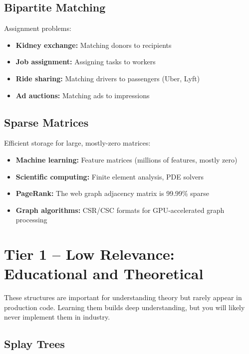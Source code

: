 \subsection{Bipartite Matching}

Assignment problems:
\begin{itemize}
    \item \textbf{Kidney exchange:} Matching donors to recipients
    \item \textbf{Job assignment:} Assigning tasks to workers
    \item \textbf{Ride sharing:} Matching drivers to passengers (Uber, Lyft)
    \item \textbf{Ad auctions:} Matching ads to impressions
\end{itemize}

\subsection{Sparse Matrices}

Efficient storage for large, mostly-zero matrices:
\begin{itemize}
    \item \textbf{Machine learning:} Feature matrices (millions of features, mostly zero)
    \item \textbf{Scientific computing:} Finite element analysis, PDE solvers
    \item \textbf{PageRank:} The web graph adjacency matrix is 99.99\% sparse
    \item \textbf{Graph algorithms:} CSR/CSC formats for GPU-accelerated graph processing
\end{itemize}


\section{Tier 1 -- Low Relevance: Educational and Theoretical}

These structures are important for understanding theory but rarely appear in production code. Learning them builds deep understanding, but you will likely never implement them in industry.

\subsection{Splay Trees}

